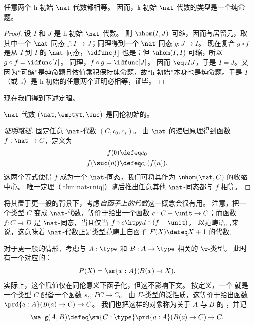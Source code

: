 \begin{thm}
  任意两个 h-初始 $\nat$-代数都相等。
  因而，h-初始 $\nat$-代数的类型是一个纯命题。
\end{thm}
\begin{proof}
  设 $I$ 和 $J$ 是 h-初始 $\nat$-代数。
  则 $\nhom(I,J)$ 可缩，因而有居留元，取其中一个 $\nat$-同态 $f:I\to J$；同理得到一个 $\nat$-同态 $g:J\to I$。
  现在复合 $g\circ f$ 是从 $I$ 到 $I$ 的 $\nat$-同态，$\idfunc[I]$ 也是；但 $\nhom(I,I)$ 可缩，所以 $g\circ f = \idfunc[I]$。
  同理，$f\circ g = \idfunc[J]$。
  因而 $\eqv IJ$，于是 $I=J$。又因为“可缩”是纯命题且依值乘积保持纯命题，故“h-初始”本身也是纯命题。于是 $I$（或 $J$）是 h-初始的任意两个证明必相等，证毕。
\end{proof}

现在我们得到下述定理。

\begin{thm}\label{thm:nat-hinitial}
$\nat$-代数 $(\nat, \emptyt, \suc)$ 是同伦初始的。
\end{thm}
\begin{proof}[证明略述]
  固定任意 $\nat$-代数 $(C,c_0,c_s)$。
  由 $\nat$ 的递归原理得到函数 $f:\nat\to C$，定义为
  \begin{align*}
    f(0) &\defeq c_0\\
    f(\suc(n)) &\defeq c_s(f(n)).
  \end{align*}
  这两个等式使得 $f$ 成为一个 $\nat$-同态，我们可将其作为 $\nhom(\nat,C)$ 的收缩中心。
  唯一定理（\cref{thm:nat-uniq}）随后推出任意其他 $\nat$-同态都与 $f$ 相等。
\end{proof}

将其置于更一般的背景下，考虑\emph{自函子上的代数}这一概念会很有用。
注意，把一个类型 $C$ 变成 $\nat$-代数，等价于给出一个函数 $c:C+\unit\to C$；而函数 $f:C\to D$ 是 $\nat$-同态，当且仅当 $f \circ c \htpy d \circ (f+\unit)$。
以范畴语言来说，这意味着 $\nat$-代数正是类型范畴上自函子 $F(X)\defeq X+1$ 的代数。

%
%
%
对于更一般的情形，考虑与 $A : \type$ 和 $B : A \to \type$ 相关的 $\w$-类型。
此时有一个对应的：
\begin{equation}
\label{eq:polyfunc}
P(X) = \sm{x : A} (B(x) \rightarrow X).
\end{equation}
实际上，这个赋值仅在同伦意义下函子化，但这不影响下文。
按定义，一个
%
%
就是一个类型 $C$ 配备一个函数 $s_C :  PC \rightarrow C$。
由 $\Sigma$-类型的泛性质，这等价于给出函数 $\prd{a:A} (B(a) \to C) \to C$。
我们也把这样的对象称为关于 $A$ 与 $B$ 的
%
，并记
\begin{equation*}
\walg(A,B) \defeq \sm {C : \type} \prd{a:A} (B(a) \to C) \to C.
\end{equation*}

